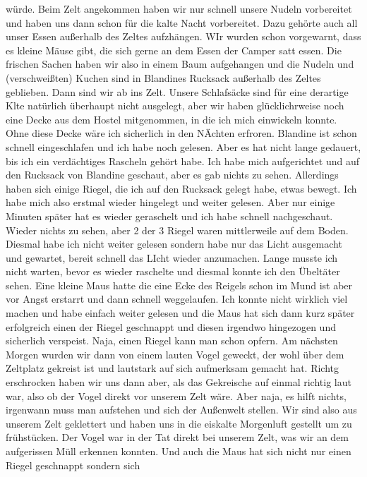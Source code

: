 \documentclass[11pt]{book}
\begin{document}
würde. Beim Zelt angekommen haben wir nur schnell unsere Nudeln vorbereitet und haben uns dann schon für die kalte Nacht vorbereitet. 
Dazu gehörte auch all unser Essen außerhalb des Zeltes aufzhängen. WIr wurden schon vorgewarnt, dass es kleine Mäuse gibt, die sich 
gerne an dem Essen der Camper satt essen. Die frischen Sachen haben wir also in einem Baum aufgehangen und die Nudeln und (verschweißten) 
Kuchen sind in Blandines Rucksack außerhalb des Zeltes geblieben. Dann sind wir ab ins Zelt. Unsere Schlafsäcke sind für eine derartige 
Klte natürlich überhaupt nicht ausgelegt, aber wir haben glücklichrweise noch eine Decke aus dem Hostel mitgenommen, in die ich mich 
einwickeln konnte. Ohne diese Decke wäre ich sicherlich in den NÄchten erfroren. Blandine ist schon schnell eingeschlafen und ich 
habe noch gelesen. Aber es hat nicht lange gedauert, bis ich ein verdächtiges Rascheln gehört habe. Ich habe mich aufgerichtet und auf 
den Rucksack von Blandine geschaut, aber es gab nichts zu sehen. Allerdings haben sich einige Riegel, die ich auf den Rucksack gelegt 
habe, etwas bewegt. Ich habe mich also erstmal wieder hingelegt und weiter gelesen. Aber nur einige Minuten später hat es wieder 
geraschelt und ich habe schnell nachgeschaut. Wieder nichts zu sehen, aber 2 der 3 Riegel waren mittlerweile auf dem Boden. Diesmal 
habe ich nicht weiter gelesen sondern habe nur das Licht ausgemacht und gewartet, bereit schnell das LIcht wieder anzumachen. 
Lange musste ich nicht warten, bevor es wieder raschelte und diesmal konnte ich den Übeltäter sehen. Eine kleine Maus hatte die eine 
Ecke des Reigels schon im Mund ist aber vor Angst erstarrt und dann schnell weggelaufen. Ich konnte nicht wirklich viel machen 
und habe einfach weiter gelesen und die Maus hat sich dann kurz später erfolgreich einen der Riegel geschnappt und diesen irgendwo 
hingezogen und sicherlich verspeist. Naja, einen Riegel kann man schon opfern. 
Am nächsten Morgen wurden wir dann von einem lauten Vogel geweckt, der wohl über dem Zeltplatz gekreist ist und lautstark auf sich 
aufmerksam gemacht hat. Richtg erschrocken haben wir uns dann aber, als das Gekreische auf einmal richtig laut war, also ob der Vogel 
direkt vor unserem Zelt wäre. Aber naja, es hilft nichts, irgenwann muss man aufstehen und sich der Außenwelt stellen. Wir sind also aus 
unserem Zelt geklettert und haben uns in die eiskalte Morgenluft gestellt um zu frühstücken. Der Vogel war in der Tat direkt bei 
unserem Zelt, was wir an dem aufgerissen Müll erkennen konnten. Und auch die Maus hat sich nicht nur einen Riegel geschnappt sondern sich 
\end{document}
